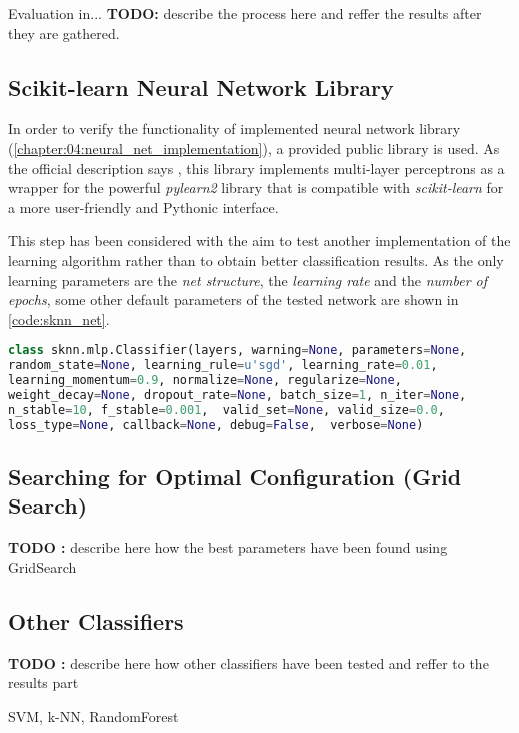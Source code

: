 Evaluation in... \textbf{TODO:} describe the process here and reffer the results after they are gathered.


\subsection{Scikit-learn Neural Network Library} \label{ssec:sknn}
In order to verify the functionality of implemented neural network library (\cref{chapter:04:neural_net_implementation}), a provided public library is used. As the official description says \citep{misc:sknn}, this library implements multi-layer perceptrons as a wrapper for the powerful \textit{pylearn2} library that is compatible with \textit{scikit-learn} for a more user-friendly and Pythonic interface.

This step has been considered with the aim to test another implementation of the learning algorithm rather than to obtain better classification results. As the only learning parameters are the \textit{net structure}, the \textit{learning rate} and the \textit{number of epochs}, some other default parameters of the tested network are shown in \cref{code:sknn_net}.

\begin{lstlisting}[language=Python, caption={Sknn classifier specification \citep{misc:sknn}}, label=code:sknn_net]
class sknn.mlp.Classifier(layers, warning=None, parameters=None, 
random_state=None, learning_rule=u'sgd', learning_rate=0.01, 
learning_momentum=0.9, normalize=None, regularize=None, 
weight_decay=None, dropout_rate=None, batch_size=1, n_iter=None, 
n_stable=10, f_stable=0.001,  valid_set=None, valid_size=0.0, 
loss_type=None, callback=None, debug=False,  verbose=None)
\end{lstlisting}

\subsection{Searching for Optimal Configuration (Grid Search)} \label{ssec:grid_search}
\textbf{TODO :} describe here how the best parameters have been found using GridSearch

\subsection{Other Classifiers} \label{ssec:other_classifiers}
\textbf{TODO :} describe here how other classifiers have been tested and reffer to the results part

SVM, k-NN, RandomForest